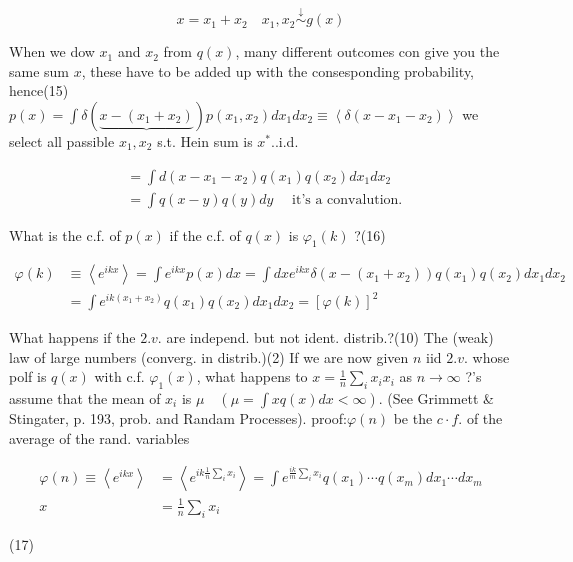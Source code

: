 $$ 
 x=x_{1}+x_{2} \quad x_{1}, x_{2} \stackrel{\downarrow}{\sim} g(x) 
$$ 

When we dow $x_{1}$ and $x_{2}$ from $q(x)$, many different outcomes con give you the same sum $x$, these have to be added up with the consesponding probability, hence\n(15) $p(x)=\int \delta(\underbrace{x-\left(x_{1}+x_{2}\right)}) p\left(x_{1}, x_{2}\right) d x_{1} d x_{2} \equiv\left\langle\delta\left(x-x_{1}-x_{2}\right)\right\rangle$ we select all passible $x_{1}, x_{2}$ s.t. Hein sum is $x^{*}$.\ni.i.d.

$$ 
\begin{aligned}
& =\int d\left(x-x_{1}-x_{2}\right) q\left(x_{1}\right) q\left(x_{2}\right) d x_{1} d x_{2} \\
& =\int q(x-y) q(y) d y \quad \text { it's a convalution. }
\end{aligned}
$$ 

What is the c.f. of $p(x)$ if the c.f. of $q(x)$ is $\varphi_{1}(k)$ ?\n(16)

$$ 
\begin{aligned}
\varphi(k) & \equiv\left\langle e^{i k x}\right\rangle=\int e^{i k x} p(x) d x=\int d x e^{i k x} \delta\left(x-\left(x_{1}+x_{2}\right)\right) q\left(x_{1}\right) q\left(x_{2}\right) d x_{1} d x_{2} \\
& =\int e^{i k\left(x_{1}+x_{2}\right)} q\left(x_{1}\right) q\left(x_{2}\right) d x_{1} d x_{2}=[\varphi(k)]^{2}
\end{aligned}
$$ 

What happens if the $2 . v$. are independ. but not ident. distrib.?\n(10) The (weak) law of large numbers (converg. in distrib.)\n(2) If we are now given $n$ iid $2 . v$. whose polf is $q(x)$ with c.f. $\varphi_{1}(x)$, what happens to $x=\frac{1}{n} \sum_{i} x_{i} x_{i}$ as $n \rightarrow \infty$ ?\nLet's assume that the mean of $x_{i}$ is $\mu \quad\left(\mu=\int x q(x) d x<\infty\right)$. (See Grimmett & Stingater, p. 193, prob. and Randam Processes). proof:\nLet $\varphi(n)$ be the $c \cdot f$. of the average of the rand. variables

$$ 
\begin{aligned}
\varphi(n) \equiv\left\langle e^{i k x}\right\rangle & =\left\langle e^{i k \frac{1}{n} \sum_{i} x_{i}}\right\rangle=\int e^{\frac{i k}{m} \sum_{i} x_{i}} q\left(x_{1}\right) \cdots q\left(x_{m}\right) d x_{1} \cdots d x_{m} \\x & =\frac{1}{n} \sum_{i} x_{i}
\end{aligned}
$$ 

(17)

